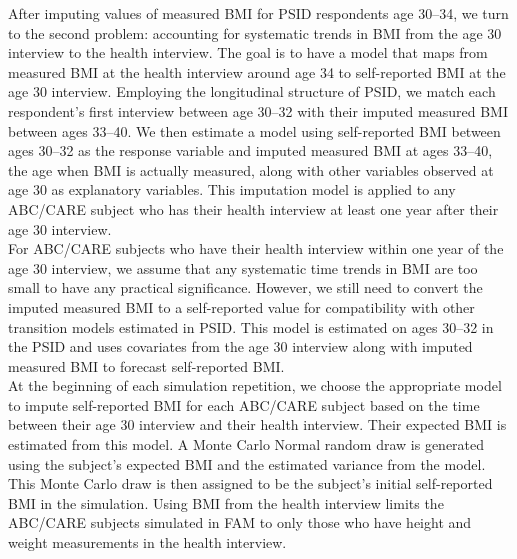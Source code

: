 \noindent After imputing values of measured BMI for PSID respondents age 30--34, we turn to the second problem: accounting for systematic trends in BMI from the age 30 interview to the health interview. The goal is to have a model that maps from measured BMI at the health interview around age 34 to self-reported BMI at the age 30 interview. Employing the longitudinal structure of PSID, we match each respondent's first interview between age 30--32 with their imputed measured BMI between ages 33--40. We then estimate a model using self-reported BMI between ages 30--32 as the response variable and imputed measured BMI at ages 33--40, the age when BMI is actually measured, along with other variables observed at age 30 as explanatory variables. This imputation model is applied to any ABC/CARE subject who has their health interview at least one year after their age 30 interview.\\

\noindent For ABC/CARE subjects who have their health interview within one year of the age 30 interview, we assume that any systematic time trends in BMI are too small to have any practical significance. However, we still need to convert the imputed measured BMI to a self-reported value for compatibility with other transition models estimated in PSID. This model is estimated on ages 30--32 in the PSID and uses covariates from the age 30 interview along with imputed measured BMI to forecast self-reported BMI. \\

\noindent At the beginning of each simulation repetition, we choose the appropriate model to impute self-reported BMI for each ABC/CARE subject based on the time between their age 30 interview and their health interview. Their expected BMI is estimated from this model. A Monte Carlo Normal random draw is generated using the subject's expected BMI and the estimated variance from the model. This Monte Carlo draw is then assigned to be the subject's initial self-reported BMI in the simulation. Using BMI from the health interview limits the ABC/CARE subjects simulated in FAM to only those who have height and weight measurements in the health interview. \\

